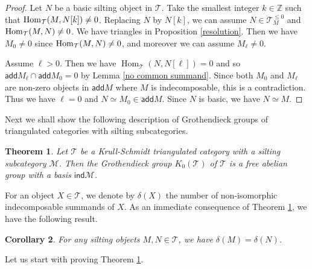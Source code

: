 \documentclass[a4paper,reqno]{amsart}
\newtheorem{theorem}{Theorem}[section]
\newtheorem{corollary}[theorem]{Corollary}
\theoremstyle{definition}
\newcommand{\TT}{{\mathcal T}}
\newcommand{\MM}{{\mathcal M}}
\newcommand{\Z}{\mathbb{Z}}
\newcommand{\ind}{\mathsf{ind}}
\newcommand{\add}{\mathsf{add}}
\newcommand{\Hom}{\operatorname{Hom}\nolimits}
\newcommand{\homo}[3]{{\rm{Hom}}_{#1}(#2, #3)} %
\begin{document}
\begin{proof}
Let $N$ be a basic silting object in $\TT$. 
Take the smallest integer $k\in\Z$ such that $\homo{\TT}{M}{N[k]}\not=0$.
Replacing $N$ by $N[k]$, we can assume $N\in \TT^{\leq 0}_{M}$
and $\homo{\TT}{M}{N}\not=0$. 
We have triangles in Proposition \ref{resolution}. 
Then we have $M_0\neq0$ since $\homo{\TT}{M}{N}\neq0$,
and moreover we can assume $M_{\ell}\neq0$.

Assume $\ell>0$. Then we have $\Hom_{\TT}(N,N[\ell])=0$ and so
$\add{M_{\ell}}\cap \add{M_{0}}=0$ by Lemma \ref{no common summand}. 
Since both $M_0$ and $M_{\ell}$ are non-zero objects in $\add M$
where $M$ is indecomposable, this is a contradiction.
Thus we have $\ell=0$ and $N\simeq M_0\in \add M$.
Since $N$ is basic, we have $N\simeq M$.
\end{proof}


Next we shall show the following description of Grothendieck groups of triangulated categories with silting subcategories.

\begin{theorem}\label{grothendieck}
Let $\TT$ be a Krull-Schmidt triangulated category with a silting subcategory $\MM$.
Then the Grothendieck group $K_0(\TT)$ of $\TT$ is a free abelian group with a basis $\ind\MM$.
\end{theorem}
 
For an object $X\in\TT$, we denote by $\delta(X)$ the number of non-isomorphic indecomposable summands of $X$.
As an immediate consequence of Theorem \ref{grothendieck}, we have the following result.

\begin{corollary}\label{thm:number of indecomposable direct summands}
For any silting objects $M,N\in \TT$, we have $\delta (M)=\delta (N)$.
\end{corollary}

Let us start with proving Theorem \ref{grothendieck}.
\end{document}
